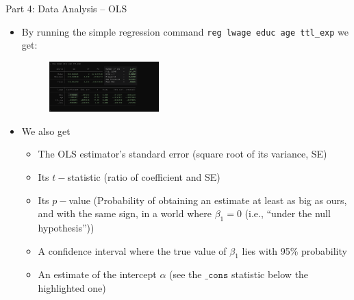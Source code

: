 \documentclass[11pt,notes=hide,aspectratio=169,mathserif]{beamer}
\begin{document}
\begin{frame}{Part 4: Data Analysis -- OLS}
    \begin{itemize}
        \item By running the simple regression command \texttt{reg lwage educ age ttl\_exp} we get:  
        \begin{figure}
            \centering
            \includegraphics[width=0.4\textwidth]{inputs/reg1.png}
        \end{figure}
        \item We also get 
        \begin{itemize}
        \item The OLS estimator's standard error (square root of its variance, SE)
        \item Its $t-$statistic (ratio of coefficient and SE)
        \item Its $p-$value (Probability of obtaining an estimate at least as big as ours, and with the same sign, in a world where $\beta_1=0$ (i.e., ``under the null hypothesis''))
        \item A confidence interval where the true value of $\beta_1$ lies with 95\% probability
        \item An estimate of the intercept $\alpha$ (see the $\texttt{\_cons}$ statistic below the highlighted one)
        \end{itemize}
    \end{itemize}
\end{frame}
\end{document}
